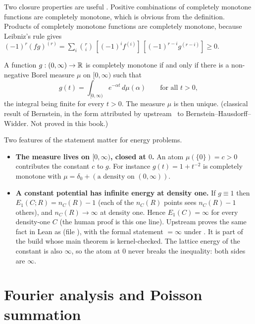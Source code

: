 Two closure properties are useful \tierC{}. Positive combinations of completely monotone functions are completely
monotone, which is obvious from the definition. Products of completely monotone functions are completely monotone,
because Leibniz's rule gives $(-1)^r(fg)^{(r)}=\sum_i\binom ri\,[(-1)^if^{(i)}]\,[(-1)^{r-i}g^{(r-i)}]\ge0$.

\begin{theorem}\label{thm:bernstein}
A function $g:(0,\infty)\to\mathbb{R}$ is completely monotone if and only if there is a non-negative Borel measure $\mu$ on
$[0,\infty)$ such that
\[
  g(t)=\int_{[0,\infty)}e^{-\alpha t}\,d\mu(\alpha)\qquad\text{for all }t>0,
\]
the integral being finite for every $t>0$. The measure $\mu$ is then unique. \tierL{} (classical result of Bernstein,
in the form attributed by upstream~\cite{oai} to Bernstein--Hausdorff--Widder. Not proved in this book.)
\end{theorem}

Two features of the statement matter for energy problems.
\begin{itemize}
\item \textbf{The measure lives on $[0,\infty)$, closed at $0$.} An atom $\mu(\{0\})=c>0$ contributes the constant $c$
to $g$. For instance $g(t)=1+t^{-2}$ is completely monotone with $\mu=\delta_0+(\text{a density on }(0,\infty))$.
\item \textbf{A constant potential has infinite energy at density one.} If $g\equiv1$ then $E_1(C;R)=n_C(R)-1$ (each of
the $n_C(R)$ points sees $n_C(R)-1$ others), and $n_C(R)\to\infty$ at density one. Hence $E_1(C)=\infty$ for every
density-one $C$ \tierC{} (the human proof is this one line). Upstream proves the same fact in Lean as
 (file ), with the formal statement
 $=\infty$ under . It is part of the build whose main theorem is kernel-checked.
The lattice energy of the constant is also $\infty$, so the atom at $0$ never breaks the inequality: both sides are
$\infty$.
\end{itemize}

\section{Fourier analysis and Poisson summation}
\label{sec:fourier}

